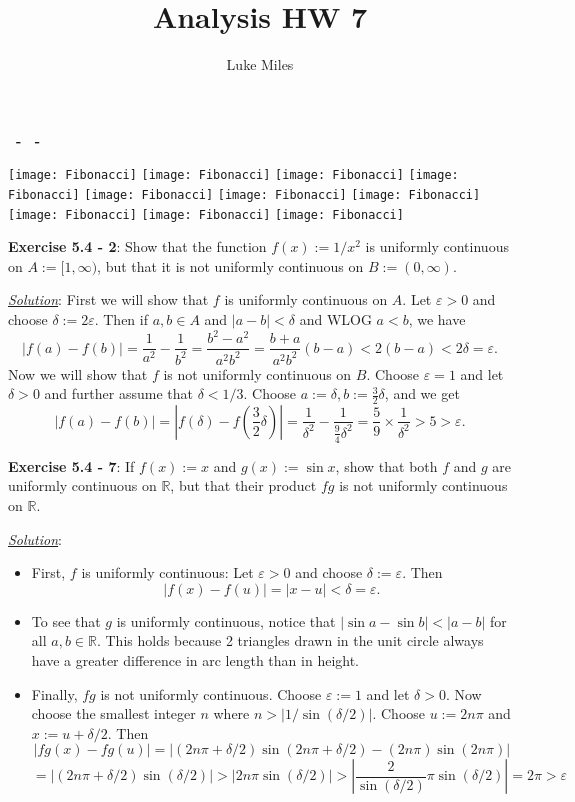 \documentclass{article}
\title{Analysis HW 7}
\author{Luke Miles}
\begin{document}
\raggedright %
\renewcommand{\thefootnote}{\fnsymbol{footnote}} %

\makeatletter
\textbf{\@title\ - \@author\ - \@date}
\makeatother

\centerline{
  \texttt{[image: Fibonacci]}
  \texttt{[image: Fibonacci]}
  \texttt{[image: Fibonacci]}
  \texttt{[image: Fibonacci]}
  \texttt{[image: Fibonacci]}
  \texttt{[image: Fibonacci]}
  \texttt{[image: Fibonacci]}
  \texttt{[image: Fibonacci]}
  \texttt{[image: Fibonacci]}
  \texttt{[image: Fibonacci]}
}

\hrulefill

\textbf{Exercise 5.4 - 2}: Show that the function $f(x):=1/x^2$ is uniformly
continuous on $A:=[1,\infty)$, but that it is not uniformly continuous on
$B:= (0,\infty)$.

\underline{\textit{Solution}}: First we will show that $f$ is uniformly
continuous on $A$.  Let $\varepsilon>0$ and choose $\delta:=2\varepsilon$.
Then if $a,b\in A$ and $|a-b|<\delta$ and WLOG $a<b$, we have
\[
  |f(a)-f(b)|=\frac1{a^2}-\frac1{b^2}=\frac{b^2-a^2}{a^2b^2}
  =\frac{b+a}{a^2b^2}(b-a)<2(b-a)<2\delta=\varepsilon.
\]
Now we will show that $f$ is not uniformly continuous on $B$. Choose
$\varepsilon=1$ and let $\delta>0$ and further assume that $\delta<1/3$.
Choose $a:=\delta,b:=\frac32\delta$, and we get
\[
  |f(a)-f(b)|=|f(\delta)-f(\frac32\delta)|
  =\frac1{\delta^2}-\frac1{\frac94\delta^2}
  =\frac59\times\frac1{\delta^2}>5>\varepsilon.
\]

\hrulefill

\textbf{Exercise 5.4 - 7}: If $f(x):=x$ and $g(x):=\sin x$, show that both
$f$ and $g$ are uniformly continuous on $\mathbb R$, but that their product
$fg$ is not uniformly continuous on $\mathbb R$.

\underline{\textit{Solution}}:
\begin{itemize}
  \item First, $f$ is uniformly continuous:
    Let $\varepsilon>0$ and choose $\delta:=\varepsilon$. Then
    \[|f(x)-f(u)|=|x-u|<\delta=\varepsilon.\]
  \item To see that $g$ is uniformly continuous, notice that
    $|\sin a-\sin b|<|a-b|$ for all $a,b\in\mathbb R$. This holds because 2
    triangles drawn in the unit circle always have a greater difference in
    arc length than in height.
  \item Finally, $fg$ is not uniformly continuous. Choose $\varepsilon:=1$
    and let $\delta>0$. Now choose the smallest integer $n$ where
    $n>|1/\sin(\delta/2)|$. Choose $u:=2n\pi$ and $x:=u+\delta/2$. Then
    \[
      |fg(x)-fg(u)|
      =|(2n\pi+\delta/2)\sin(2n\pi+\delta/2)-(2n\pi)\sin(2n\pi)|
    \]\[
      =|(2n\pi+\delta/2)\sin(\delta/2)|
      >|2n\pi\sin(\delta/2)|
      >\left|\frac2{\sin(\delta/2)}\pi\sin(\delta/2)\right|
      =2\pi
      >\varepsilon
    \]
\end{itemize}
\end{document}
